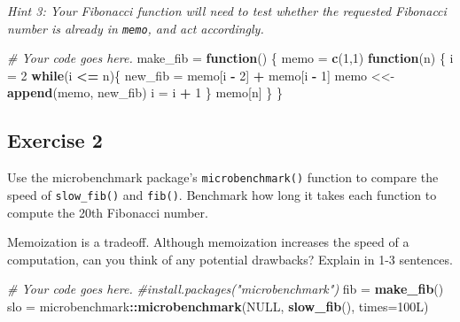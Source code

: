 \documentclass[
]{article}
\newenvironment{Shaded}{\begin{snugshade}}{\end{snugshade}}
\newcommand{\CommentTok}[1]{\textcolor[rgb]{0.56,0.35,0.01}{\textit{#1}}}
\newcommand{\ControlFlowTok}[1]{\textcolor[rgb]{0.13,0.29,0.53}{\textbf{#1}}}
\newcommand{\DataTypeTok}[1]{\textcolor[rgb]{0.13,0.29,0.53}{#1}}
\newcommand{\DecValTok}[1]{\textcolor[rgb]{0.00,0.00,0.81}{#1}}
\newcommand{\KeywordTok}[1]{\textcolor[rgb]{0.13,0.29,0.53}{\textbf{#1}}}
\newcommand{\NormalTok}[1]{#1}
\newcommand{\OperatorTok}[1]{\textcolor[rgb]{0.81,0.36,0.00}{\textbf{#1}}}
\newcommand{\OtherTok}[1]{\textcolor[rgb]{0.56,0.35,0.01}{#1}}
\newcommand{\StringTok}[1]{\textcolor[rgb]{0.31,0.60,0.02}{#1}}
\begin{document}
\emph{Hint 3: Your Fibonacci function will need to test whether the
requested Fibonacci number is already in \texttt{memo}, and act
accordingly.}

\begin{Shaded}
\begin{Highlighting}[]
\CommentTok{# Your code goes here.}
\NormalTok{make_fib =}\StringTok{ }\ControlFlowTok{function}\NormalTok{() \{}
\NormalTok{  memo =}\StringTok{ }\KeywordTok{c}\NormalTok{(}\DecValTok{1}\NormalTok{,}\DecValTok{1}\NormalTok{)}
  \ControlFlowTok{function}\NormalTok{(n) \{}
\NormalTok{    i =}\StringTok{ }\DecValTok{2}
    \ControlFlowTok{while}\NormalTok{(i }\OperatorTok{<=}\StringTok{ }\NormalTok{n)\{}
\NormalTok{      new_fib =}\StringTok{ }\NormalTok{memo[i }\OperatorTok{-}\StringTok{ }\DecValTok{2}\NormalTok{] }\OperatorTok{+}\StringTok{ }\NormalTok{memo[i }\OperatorTok{-}\StringTok{ }\DecValTok{1}\NormalTok{]}
\NormalTok{      memo <<-}\StringTok{ }\KeywordTok{append}\NormalTok{(memo, new_fib)}
\NormalTok{      i =}\StringTok{ }\NormalTok{i }\OperatorTok{+}\StringTok{ }\DecValTok{1}
\NormalTok{    \}}
\NormalTok{    memo[n]}
\NormalTok{  \}}
\NormalTok{\}}
\end{Highlighting}
\end{Shaded}

\hypertarget{exercise-2}{%
\subsection{Exercise 2}\label{exercise-2}}

Use the microbenchmark package's \texttt{microbenchmark()} function to
compare the speed of \texttt{slow\_fib()} and \texttt{fib()}. Benchmark
how long it takes each function to compute the 20th Fibonacci number.

Memoization is a tradeoff. Although memoization increases the speed of a
computation, can you think of any potential drawbacks? Explain in 1-3
sentences.

\begin{Shaded}
\begin{Highlighting}[]
\CommentTok{# Your code goes here.}
\CommentTok{#install.packages("microbenchmark")}
\NormalTok{fib =}\StringTok{ }\KeywordTok{make_fib}\NormalTok{()}
\NormalTok{slo =}\StringTok{ }\NormalTok{microbenchmark}\OperatorTok{::}\KeywordTok{microbenchmark}\NormalTok{(}\OtherTok{NULL}\NormalTok{, }\KeywordTok{slow_fib}\NormalTok{(), }\DataTypeTok{times=}\NormalTok{100L)}
\end{Highlighting}
\end{Shaded}
\end{document}
